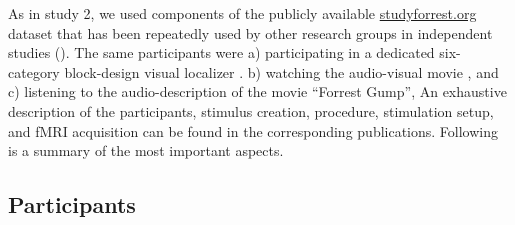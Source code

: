 


As in study 2, we
%
used components of the publicly available
\href{http://www.studyforrest.org}{studyforrest.org} dataset that has been
repeatedly used by other research groups in independent studies
(\citep[e.g.,][]{ben2018hippocampal, jiahui2020predicting, hu2017decoding,
lettieri2019emotionotopy, nguyen2016integration}).
The same participants were
a) participating in a dedicated six-category block-design visual localizer
\citep{sengupta2016extension}.
b) watching the audio-visual movie \citep{hanke2016simultaneous}, and
c) listening to the audio-description \citep{hanke2014audiomovie} of the movie
``Forrest Gump'',
An exhaustive description of the participants, stimulus creation, procedure,
stimulation setup, and fMRI acquisition can be found in the corresponding
publications. Following is a summary of the most important aspects.


\subsection{Participants}

